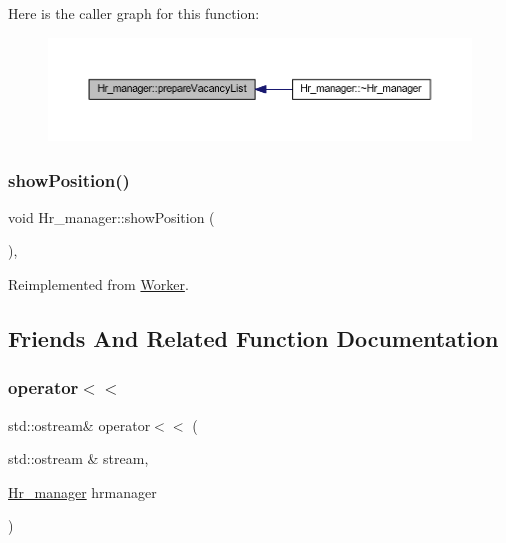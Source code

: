 Here is the caller graph for this function\+:
\nopagebreak
\begin{figure}[H]
\begin{center}
\leavevmode
\includegraphics[width=350pt]{class_hr__manager_a579ebdb8579aace02b9c2d2f29051c77_icgraph}
\end{center}
\end{figure}
\hypertarget{class_hr__manager_a760e884af11ec93a1dbf3769cdf34adf}{}\label{class_hr__manager_a760e884af11ec93a1dbf3769cdf34adf} 
\subsubsection{\texorpdfstring{show\+Position()}{showPosition()}}
{\footnotesize\ttfamily void Hr\+\_\+manager\+::show\+Position (\begin{DoxyParamCaption}{ }\end{DoxyParamCaption})\hspace{0.3cm}{\ttfamily [inline]}, {\ttfamily [virtual]}}



Reimplemented from \hyperlink{class_worker_aaba3653d2ee34cb8834e8d631989090f}{Worker}.



\subsection{Friends And Related Function Documentation}
\hypertarget{class_hr__manager_a954d2b0eb5d6bd979593a3d4018f52c5}{}\label{class_hr__manager_a954d2b0eb5d6bd979593a3d4018f52c5} 
\subsubsection{\texorpdfstring{operator$<$$<$}{operator<<}}
{\footnotesize\ttfamily std\+::ostream\& operator$<$$<$ (\begin{DoxyParamCaption}\item[{std\+::ostream \&}]{stream,  }\item[{\hyperlink{class_hr__manager}{Hr\+\_\+manager}}]{hrmanager }\end{DoxyParamCaption})\hspace{0.3cm}{\ttfamily [friend]}}



